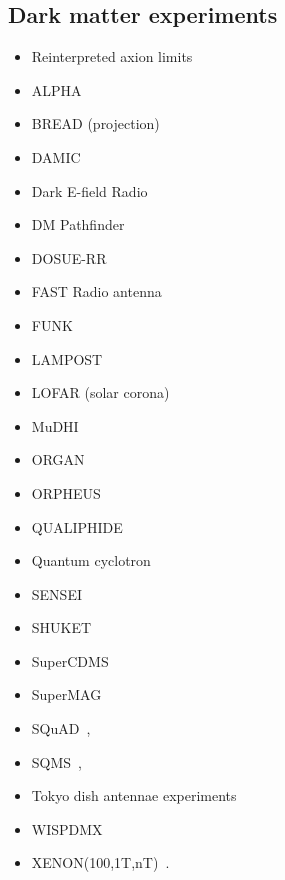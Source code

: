 \documentclass[9pt,twocolumn]{extarticle}
\begin{document}
\begin{mdframed}
\subsection*{Dark matter experiments}\vspace{-0.5em}
\begin{itemize}\setlength\itemsep{-0.5em}
\item Reinterpreted axion limits~\cite{Caputo:2021eaa}
\item ALPHA~\cite{}
\item BREAD (projection)~\cite{Liu:2021pei}
\item DAMIC~\cite{Aguilar-Arevalo:2019wdi}
\item Dark E-field Radio~\cite{Godfrey:2021tvs}
\item DM Pathfinder~\cite{Phipps:2019cqy}
\item DOSUE-RR~\cite{DOSUE-RR:2022ise}
 \item FAST Radio antenna~\cite{An:2022hhb}
\item FUNK~\cite{Andrianavalomahefa:2020ucg}
\item LAMPOST~\cite{Chiles:2021gxk}
\item LOFAR (solar corona)~\cite{An:2023wij}
\item MuDHI~\cite{Manenti:2021whp}
\item ORGAN~\cite{McAllister:2022ibe}
\item ORPHEUS~\cite{Cervantes:2022yzp}
\item QUALIPHIDE~\cite{Ramanathan:2022egk}
\item Quantum cyclotron~\cite{Fan:2022uwu}
\item SENSEI~\cite{Barak:2020fql}
\item SHUKET~\cite{Brun:2019kak}
\item SuperCDMS~\cite{Aralis:2019nfa}
\item SuperMAG~\cite{Fedderke:2021rrm,Fedderke:2021aqo}
\item SQuAD~\cite{Dixit:2020ymh},
\item SQMS~\cite{Cervantes:2022gtv},
\item Tokyo dish antennae experiments~\cite{Suzuki:2015sza,Knirck:2018ojz,Tomita:2020usq}
\item  WISPDMX~\cite{Nguyen:2019xuh}
\item  XENON(100,1T,nT)~\cite{Bloch:2016sjj,Aprile:2019xxb,Aprile:2020tmw, Bloch:2020uzh,XENON:2021myl,An:2020bxd}. 
\end{itemize}
\end{mdframed}


\onecolumn{


}
\end{document}
